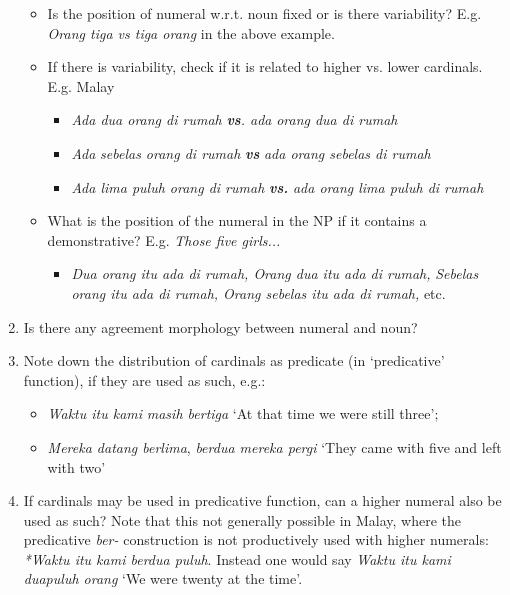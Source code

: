 \begin{enumerate}
\begin{itemize}
\item Is the position of numeral w.r.t. noun fixed or is there variability? E.g. \textit{Orang tiga vs tiga orang} in the above example.
\item If there is variability, check if it is related to higher vs. lower cardinals. E.g. Malay 
\begin{itemize}
\item \textit{Ada dua orang di rumah} \textbf{\textit{vs}}\textit{. ada} \textit{orang dua di rumah}
\item \textit{Ada} \textit{sebelas orang di rumah} \textbf{\textit{vs}} \textit{ada orang sebelas di rumah}
\item \textit{Ada lima puluh orang di rumah} \textbf{\textit{vs.}} \textit{ada orang lima puluh di rumah}
\end{itemize}
\item What is the position of the numeral in the NP if it contains a demonstrative? E.g. \textit{Those five girls... } 
\begin{itemize}
\item \textit{Dua orang itu ada di rumah, Orang dua itu ada di rumah,} \textit{Sebelas orang itu ada di rumah, Orang sebelas itu ada di rumah,} etc.
\end{itemize}
\end{itemize}
\item Is there any agreement morphology between numeral and noun?
\item Note down the distribution of cardinals as predicate (in `predicative' function), if they are used as such, e.g.:  
\begin{itemize}
\item \textit{Waktu itu kami} \textit{masih bertiga} `At that time we were still three'; 
\item \textit{Mereka datang berlima}, \textit{berdua mereka pergi} `They came with five and left with two'
\end{itemize}
\item If cardinals may be used in predicative function, can a higher numeral also be used as such? Note that this not generally possible in Malay, where the predicative \textit{ber-} construction is not productively used with higher numerals: \textit{*Waktu itu kami berdua puluh}. Instead one would say \textit{Waktu itu kami duapuluh orang} `We were twenty at the time'. 


\end{enumerate}
